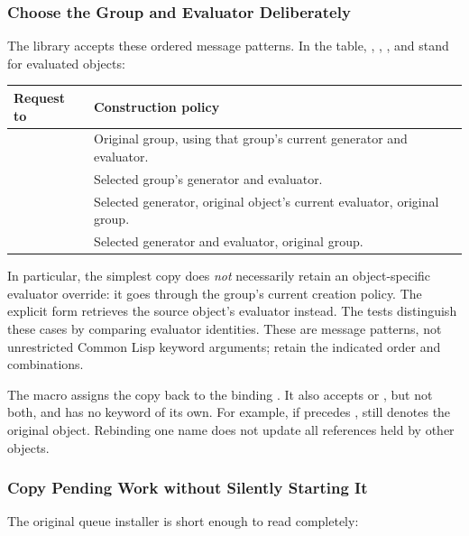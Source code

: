 \subsubsection{Choose the Group and Evaluator Deliberately}

The library accepts these ordered message patterns. In the table,
, , , and  stand for evaluated objects:

\noindent\begin{minipage}{\linewidth}
\begin{longtable}{L{0.48\textwidth}L{0.42\textwidth}}
\textbf{Request to } & \textbf{Construction policy}\\\hline
{} & Original group, using that group's current generator
and evaluator.\\
 & Selected group's generator and evaluator.\\
 & Selected generator, original object's
current evaluator, original group.\\
 & Selected generator and evaluator,
original group.\\
\end{longtable}
\end{minipage}

In particular, the simplest copy does \emph{not} necessarily retain an
object-specific evaluator override: it goes through the group's current
creation policy. The explicit  form retrieves the source
object's evaluator instead. The tests distinguish these cases by comparing
evaluator identities. These are message patterns, not unrestricted Common
Lisp keyword arguments; retain the indicated order and combinations.

The macro  assigns the copy back to the binding
. It also accepts  or , but not both,
and has no  keyword of its own. For example, if
\code{[old-reference := copy-source]} precedes ,
 still denotes the original object. Rebinding one name
does not update all references held by other objects.

\subsubsection{Copy Pending Work without Silently Starting It}

The original queue installer is short enough to read completely:

